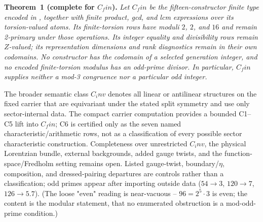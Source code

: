\documentclass[11pt]{article}
\theoremstyle{remark}
\begin{document}
\textbf{Theorem~1 (complete for $C_fin$).} \emph{Let $C_fin$ be the fifteen-constructor finite type encoded in , together with finite product, gcd, and lcm expressions over its torsion-valued atoms. Its finite-torsion rows have moduli $2$, $2$, and $16$ and remain 2-primary under those operations. Its integer equality and divisibility rows remain $Z$-valued; its representation dimensions and rank diagnostics remain in their own codomains. No constructor has the codomain of a selected generation integer, and no encoded finite-torsion modulus has an odd-prime divisor. In particular, $C_fin$ supplies neither a mod-3 congruence nor a particular odd integer.}

The broader semantic class $C_inv$ denotes all linear or antilinear structures on the fixed carrier that are equivariant under the stated split symmetry and use only sector-internal data. The compact carrier computation provides a bounded C1--C5 lift into $C_fin$; C6 is certified only as the seven named characteristic/arithmetic rows, not as a classification of every possible sector characteristic construction. Completeness over unrestricted $C_inv$, the physical Lorentzian bundle, external backgrounds, added gauge twists, and the function-space/Fredholm setting remains open. Listed gauge-twist, boundary/$\eta$, composition, and dressed-pairing departures are controls rather than a classification; odd primes appear after importing outside data ($54 \to 3$, $120 \to 7$, $126 \to 5.7$). (The loose "even" reading is near-vacuous -- $96 = 2^5 \cdot 3$ is even; the content is the modular statement, that no enumerated obstruction is a mod-odd-prime condition.)
\end{document}
